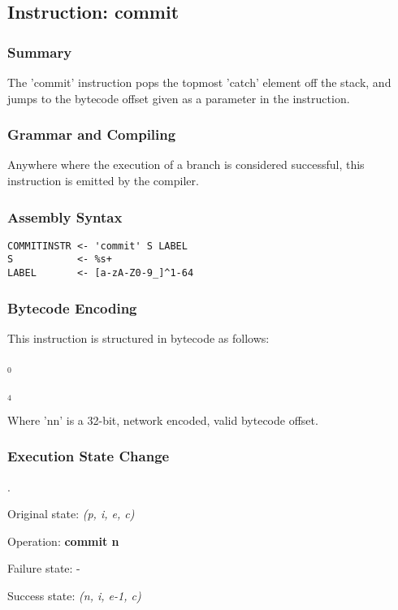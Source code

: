 \subsection{Instruction: commit}

\subsubsection{Summary}

The 'commit' instruction pops the topmost 'catch' element off the stack,
and jumps to the bytecode offset given as a parameter in the instruction.

\subsubsection{Grammar and Compiling}

Anywhere where the execution of a branch is considered successful,
this instruction is emitted by the compiler.

\subsubsection{Assembly Syntax}

\begin{myquote}
\begin{verbatim}
COMMITINSTR <- 'commit' S LABEL
S           <- %s+
LABEL       <- [a-zA-Z0-9_]^1-64

\end{verbatim}
\end{myquote}

\subsubsection{Bytecode Encoding}

This instruction is structured in bytecode as follows:

$_0$\ 


$_4$\

Where 'nn' is a 32-bit, network encoded, valid bytecode offset.

\subsubsection{Execution State Change}

.

Original state: \textit{(p, i, e, c)}

Operation: \textbf{commit n}

Failure state: -

Success state: \textit{(n, i, e-1, c)}

